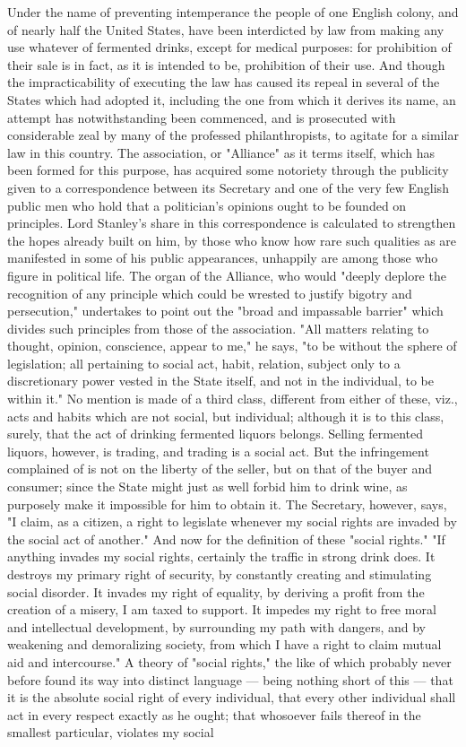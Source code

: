 \documentclass[12pt]{report}
\begin{document}
Under the name of preventing intemperance the people of one English colony, and of nearly half the United States, have been interdicted by law from making any use whatever of fermented drinks, except for medical purposes: for prohibition of their sale is in fact, as it is intended to be, prohibition of their use. And though the impracticability of executing the law has caused its repeal in several of the States which had adopted it, including the one from which it derives its name, an attempt has notwithstanding been commenced, and is prosecuted with considerable zeal by many of the professed philanthropists, to agitate for a similar law in this country. The association, or "Alliance" as it terms itself, which has been formed for this purpose, has acquired some notoriety through the publicity given to a correspondence between its Secretary and one of the very few English public men who hold that a politician's opinions ought to be founded on principles. Lord Stanley's share in this correspondence is calculated to strengthen the hopes already built on him, by those who know how rare such qualities as are manifested in some of his public appearances, unhappily are among those who figure in political life. The organ of the Alliance, who would "deeply deplore the recognition of any principle which could be wrested to justify bigotry and persecution," undertakes to point out the "broad and impassable barrier" which divides such principles from those of the association. "All matters relating to thought, opinion, conscience, appear to me," he says, "to be without the sphere of legislation; all pertaining to social act, habit, relation, subject only to a discretionary power vested in the State itself, and not in the individual, to be within it." No mention is made of a third class, different from either of these, viz., acts and habits which are not social, but individual; although it is to this class, surely, that the act of drinking fermented liquors belongs. Selling fermented liquors, however, is trading, and trading is a social act. But the infringement complained of is not on the liberty of the seller, but on that of the buyer and consumer; since the State might just as well forbid him to drink wine, as purposely make it impossible for him to obtain it. The Secretary, however, says, "I claim, as a citizen, a right to legislate whenever my social rights are invaded by the social act of another." And now for the definition of these "social rights." "If anything invades my social rights, certainly the traffic in strong drink does. It destroys my primary right of security, by constantly creating and stimulating social disorder. It invades my right of equality, by deriving a profit from the creation of a misery, I am taxed to support. It impedes my right to free moral and intellectual development, by surrounding my path with dangers, and by weakening and demoralizing society, from which I have a right to claim mutual aid and intercourse." A theory of "social rights," the like of which probably never before found its way into distinct language — being nothing short of this — that it is the absolute social right of every individual, that every other individual shall act in every respect exactly as he ought; that whosoever fails thereof in the smallest particular, violates my social 
\end{document}
